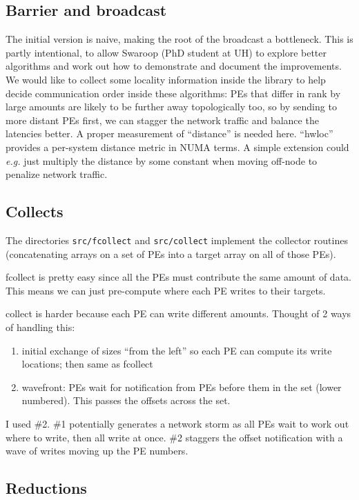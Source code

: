 \documentclass[english]{article}
\begin{document}
\subsection{Barrier and broadcast}

The initial version is naive, making the root of the broadcast a bottleneck.
This is partly intentional, to allow Swaroop (PhD student at UH) to
explore better algorithms and work out how to demonstrate and document
the improvements. We would like to collect some locality information
inside the library to help decide communication order inside these
algorithms: PEs that differ in rank by large amounts are likely to
be further away topologically too, so by sending to more distant PEs
first, we can stagger the network traffic and balance the latencies
better. A proper measurement of {}``distance'' is needed here. {}``hwloc''
provides a per-system distance metric in NUMA terms. A simple extension
could \emph{e.g.} just multiply the distance by some constant when
moving off-node to penalize network traffic.


\subsection{Collects}

The directories \texttt{src/fcollect} and \texttt{src/collect} implement
the collector routines (concatenating arrays on a set of PEs into
a target array on all of those PEs).

fcollect is pretty easy since all the PEs must contribute the same
amount of data. This means we can just pre-compute where each PE writes
to their targets.

collect is harder because each PE can write different amounts. Thought
of 2 ways of handling this:
\begin{enumerate}
\item initial exchange of sizes {}``from the left'' so each PE can compute
its write locations; then same as fcollect
\item wavefront: PEs wait for notification from PEs before them in the set
(lower numbered). This passes the offsets across the set.
\end{enumerate}
I used \#2. \#1 potentially generates a network storm as all PEs wait
to work out where to write, then all write at once. \#2 staggers the
offset notification with a wave of writes moving up the PE numbers. 


\subsection{Reductions}
\end{document}
